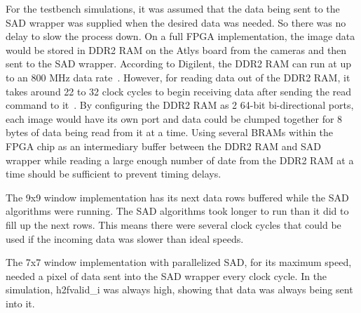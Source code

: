 For the testbench simulations, it was assumed that the data being sent to the SAD wrapper was supplied when the desired data was needed. So there was no delay to slow the process down. On a full FPGA implementation, the image data would be stored in DDR2 RAM on the Atlys board from the cameras and then sent to the SAD wrapper. According to Digilent, the DDR2 RAM can run at up to an 800 MHz data rate~\cite{atlysBoard}. However, for reading data out of the DDR2 RAM, it takes around 22 to 32 clock cycles to begin receiving data after sending the read command to it~\cite{ug388}. By configuring the DDR2 RAM as 2 64-bit bi-directional ports, each image would have its own port and data could be clumped together for 8 bytes of data being read from it at a time. Using several BRAMs within the FPGA chip as an intermediary buffer between the DDR2 RAM and SAD wrapper while reading a large enough number of date from the DDR2 RAM at a time should be sufficient to prevent timing delays.

The 9x9 window implementation has its next data rows buffered while the SAD algorithms were running. The SAD algorithms took longer to run than it did to fill up the next rows. This means there were several clock cycles that could be used if the incoming data was slower than ideal speeds.

The 7x7 window implementation with parallelized SAD, for its maximum speed, needed a pixel of data sent into the SAD wrapper every clock cycle. In the simulation, h2fvalid\_i was always high, showing that data was always being sent into it. 

